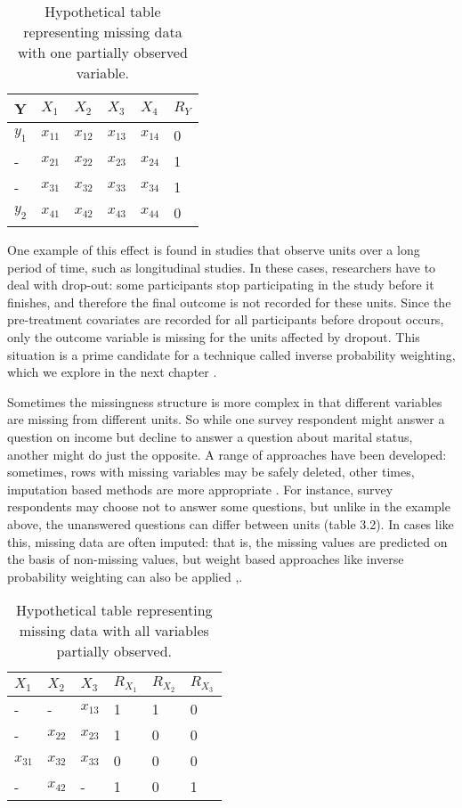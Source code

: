 \documentclass[12pt,twoside]{reedthesis}
\theoremstyle{definition}
\begin{document}
\begin{table}[]
\centering
\begin{tabular}{|l|l|l|l|l|l|}
Y     & $X_1$  & $X_2$  & $X_3$  & $X_4$  & $R_Y$ \\ \hline
$y_1$ & $x_{11}$ & $x_{12}$ & $x_{13}$ & $x_{14}$ & 0 \\
   -   & $x_{21}$ & $x_{22}$ & $x_{23}$ & $x_{24}$ & 1 \\
   -   & $x_{31}$ & $x_{32}$ & $x_{33}$ & $x_{34}$ & 1 \\
$y_2$ & $x_{41}$ & $x_{42}$ & $x_{43}$ & $x_{44}$ & 0
\end{tabular}
\caption{Hypothetical table representing missing data with one partially observed variable.} 
\end{table}

One example of this effect is found in studies that observe units over a long period of time, such as longitudinal studies. In these cases, researchers  have to deal with drop-out: some participants stop participating in the study before it finishes, and therefore the final outcome is not recorded for these units. Since the pre-treatment covariates are recorded for all participants before dropout occurs, only the outcome variable is missing for the units affected by dropout. This situation is a prime candidate for a technique called inverse probability weighting, which we explore in the next chapter \citep{Hernan_2004}.

Sometimes the missingness structure is more complex in that different variables are missing from different units. So while one survey respondent might answer a question on income but decline to answer a question about marital status, another might do just the opposite. A range of approaches have been developed: sometimes, rows with missing variables may be safely deleted, other times, imputation based methods are more appropriate \citep{Schafer_2002}.  For instance, survey respondents may choose not to answer some questions, but unlike in the example above, the unanswered questions can differ between units (table 3.2). In cases like this, missing data are often imputed: that is, the missing values are predicted on the basis of non-missing values, but weight based approaches like inverse probability weighting can also be applied \citep{Little_1986} ,\citep{Seaman_2011}. 

\begin{table}[]
\centering
\begin{tabular}{|l|l|l|l|l|l}
$X_1$    & $X_2$    & $X_3$    & $R_{X_1}$ & $R_{X_2}$ & $R_{X_3}$ \\ \hline
-        & -        & $x_{13}$ & 1         & 1         & 0         \\
-        & $x_{22}$ & $x_{23}$ & 1         & 0         & 0         \\
$x_{31}$ & $x_{32}$ & $x_{33}$ & 0         & 0         & 0         \\
-        & $x_{42}$ & -        & 1         & 0         & 1        
\end{tabular}
\caption{Hypothetical table representing missing data with all variables partially observed.}
\end{table}
\end{document}
